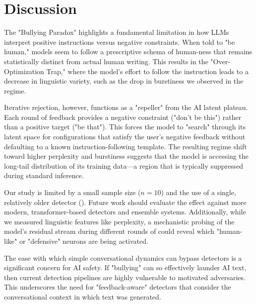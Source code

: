 \section{Discussion}
\label{sec:discussion}

The "Bullying Paradox" highlights a fundamental limitation in how LLMs interpret positive instructions versus negative constraints. When told to "be human," models seem to follow a prescriptive schema of human-ness that remains statistically distinct from actual human writing. This results in the "Over-Optimization Trap," where the model's effort to follow the instruction leads to a decrease in linguistic variety, such as the drop in burstiness we observed in the \singleshot regime.

Iterative rejection, however, functions as a "repeller" from the AI latent plateau. Each round of feedback provides a negative constraint ("don't be this") rather than a positive target ("be that"). This forces the model to "search" through its latent space for configurations that satisfy the user's negative feedback without defaulting to a known instruction-following template. The resulting regime shift toward higher perplexity and burstiness suggests that the model is accessing the long-tail distribution of its training data—a region that is typically suppressed during standard inference.

Our study is limited by a small sample size ($n=10$) and the use of a single, relatively older detector (\roberta). Future work should evaluate the \bullying effect against more modern, transformer-based detectors and ensemble systems. Additionally, while we measured linguistic features like perplexity, a mechanistic probing of the model's residual stream during different rounds of \bullying could reveal which "human-like" or "defensive" neurons are being activated.

The ease with which simple conversational dynamics can bypass detectors is a significant concern for AI safety. If "bullying" can so effectively launder AI text, then current detection pipelines are highly vulnerable to motivated adversaries. This underscores the need for "feedback-aware" detectors that consider the conversational context in which text was generated.
